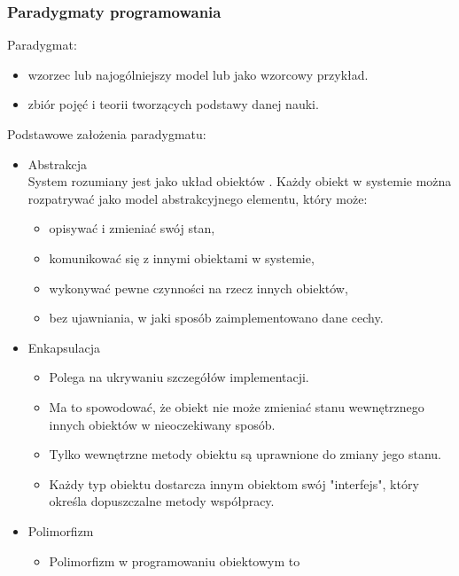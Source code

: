 \documentclass[a4paper]{article}
\begin{document}
    \subsubsection{Paradygmaty programowania}

    Paradygmat:
    \begin{itemize}
        \item wzorzec lub najogólniejszy
        model lub jako wzorcowy przykład.
        \item zbiór pojęć i teorii tworzących podstawy danej nauki.
    \end{itemize}


    Podstawowe założenia paradygmatu:
    \begin{itemize}
        \item Abstrakcja\\
        System rozumiany jest jako układ obiektów . Każdy
        obiekt w systemie można rozpatrywać jako model
        abstrakcyjnego elementu, który może:
        \begin{itemize}
            \item opisywać i zmieniać swój stan,
            \item komunikować się z innymi obiektami w systemie,
            \item wykonywać pewne czynności na rzecz innych obiektów,
            \item bez ujawniania, w jaki sposób zaimplementowano
            dane cechy.
        \end{itemize}
        \item Enkapsulacja\\
        \begin{itemize}
            \item Polega na ukrywaniu szczegółów implementacji.
            \item Ma to spowodować, że obiekt nie może zmieniać
            stanu wewnętrznego innych obiektów w
            nieoczekiwany sposób.
            \item Tylko wewnętrzne metody obiektu są uprawnione
            do zmiany jego stanu.
            \item Każdy typ obiektu dostarcza innym obiektom swój
            "interfejs", który określa dopuszczalne metody współpracy.
        \end{itemize}
        \item Polimorfizm\\
        \begin{itemize}
            \item Polimorfizm w programowaniu obiektowym to

\end{itemize}
\end{itemize}
\end{document}
